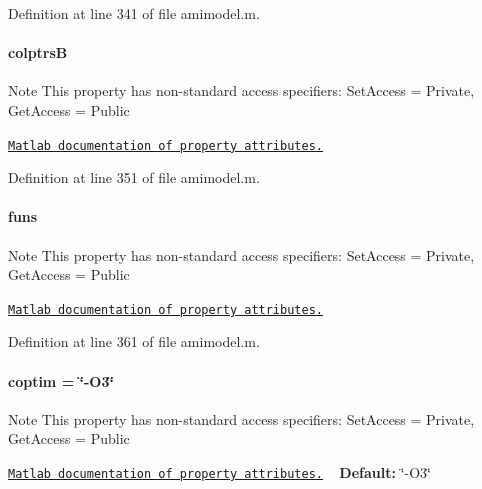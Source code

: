Definition at line 341 of file amimodel.\+m.

\hypertarget{classamimodel_a3a4891c5565b544dd7d4362dbbfaadf7}{}
\paragraph[{colptrs\+B}]{\setlength{\rightskip}{0pt plus 5cm}colptrs\+B}\label{classamimodel_a3a4891c5565b544dd7d4362dbbfaadf7}
\begin{DoxyNote}{Note}
This property has non-\/standard access specifiers\+: {\ttfamily Set\+Access = Private, Get\+Access = Public} 

\href{http://www.mathworks.com/help/matlab/matlab_oop/property-attributes.html}{\tt Matlab documentation of property attributes.} 
\end{DoxyNote}


Definition at line 351 of file amimodel.\+m.

\hypertarget{classamimodel_af80b2560853c3df2b09fef2a198cf5b8}{}
\paragraph[{funs}]{\setlength{\rightskip}{0pt plus 5cm}funs}\label{classamimodel_af80b2560853c3df2b09fef2a198cf5b8}
\begin{DoxyNote}{Note}
This property has non-\/standard access specifiers\+: {\ttfamily Set\+Access = Private, Get\+Access = Public} 

\href{http://www.mathworks.com/help/matlab/matlab_oop/property-attributes.html}{\tt Matlab documentation of property attributes.} 
\end{DoxyNote}


Definition at line 361 of file amimodel.\+m.

\hypertarget{classamimodel_ad99abcd270ac97546c46292ebc6c2e0a}{}
\paragraph[{coptim}]{\setlength{\rightskip}{0pt plus 5cm}coptim = \char`\"{}-\/O3\char`\"{}}\label{classamimodel_ad99abcd270ac97546c46292ebc6c2e0a}
\begin{DoxyNote}{Note}
This property has non-\/standard access specifiers\+: {\ttfamily Set\+Access = Private, Get\+Access = Public} 

\href{http://www.mathworks.com/help/matlab/matlab_oop/property-attributes.html}{\tt Matlab documentation of property attributes.} ~\newline
{\bfseries Default\+:} \char`\"{}-\/\+O3\char`\"{} 
\end{DoxyNote}



